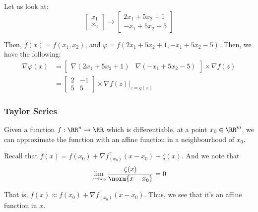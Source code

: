 \documentclass[openany]{book}
\begin{document}
\begin{example}
	Let us look at:
	\begin{equation*}
		\begin{bmatrix}
			x_1 \\ x_2
		\end{bmatrix} \rightarrow 
		\begin{bmatrix}
			2x_1 + 5x_2 + 1 \\ -x_1 + 5x_2 - 5
		\end{bmatrix}
	\end{equation*}

	Then, $f(x) = f(x_1, x_2)$, and $\varphi = f(2x_1 + 5x_2 + 1, -x_1 + 5x_2 - 5)$. Then, we have the following:
	\begin{align*}
		\nabla \varphi(x) &= \begin{bmatrix}
			\nabla (2x_1 + 5x_2 + 1) & \nabla(-x_1 + 5x_2 - 5)
		\end{bmatrix} \times \nabla f(z) \\
		&= \begin{bmatrix}
			2 & -1 \\ 5 & 5
		\end{bmatrix} \times \nabla f(z)\big|_{z=g(x)}
	\end{align*}
\end{example}

\subsubsection{Taylor Series}
Given a function $f : \RR^{n} \rightarrow \RR$ which is differentiable, at a point $x_0 \in \RR^{m}$, we can approximate the function with an affine function in a neighbourhood of $x_0$.

Recall that $f(x) = f(x_0) + \nabla f_{(x_0)}^{\intercal}(x - x_0) + \zeta(x)$. And we note that
\begin{equation*}
	\lim_{x \rightarrow x_0} \frac{\zeta(x)}{\norm{x-x_0}} = 0
\end{equation*}

That is, $f(x) \approx f(x_0) + \nabla f_{(x_0)}^{\intercal}(x- x_0)$. Thus, we see that it's an affine function in $x$.
\end{document}
